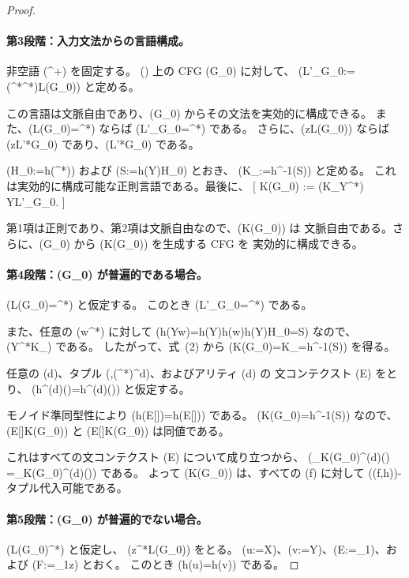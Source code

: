 \documentclass[11pt,a4paper]{ltjsarticle}
\theoremstyle{remark}
\newcommand{\D}{\mathcal{D}}
\newcommand{\tuple}[1]{\vec{#1}}
\newcommand{\blank}{\square}
\newcommand{\eps}{\varepsilon}
\begin{document}
\begin{proof}
\paragraph{第3段階：入力文法からの言語構成。}
非空語 (\beta\in\Sigma^+) を固定する。
(\Sigma) 上の CFG (G_0) に対して、
(L'_{G_0}:=(\Sigma^*\setminus\beta\Sigma^*)\cup\beta L(G_0))
と定める。

この言語は文脈自由であり、(G_0) からその文法を実効的に構成できる。
また、(L(G_0)=\Sigma^*) ならば (L'_{G_0}=\Sigma^*) である。
さらに、(z\notin L(G_0)) ならば
(\beta z\notin L'*{G_0}) であり、(\eps\in L'*{G_0}) である。

(H_0:=h(\Sigma^*)) および (S:=h(Y)H_0) とおき、
(K_{}:=h^{-1}(S)) と定める。
これは実効的に構成可能な正則言語である。最後に、
[
K(G_0)
:=
\bigl(K_{}\setminus Y\Sigma^*\bigr)
\cup YL'_{G_0}.
]

第1項は正則であり、第2項は文脈自由なので、(K(G_0)) は
文脈自由である。さらに、(G_0) から (K(G_0)) を生成する CFG を
実効的に構成できる。

\paragraph{第4段階：(G_0) が普遍的である場合。}
(L(G_0)=\Sigma^*) と仮定する。
このとき (L'_{G_0}=\Sigma^*) である。

また、任意の (w\in\Sigma^*) に対して
(h(Yw)=h(Y)h(w)\in h(Y)H_0=S) なので、
(Y\Sigma^*\subseteq K_{}) である。
したがって、式~\textup{(2)} から
(K(G_0)=K_{}=h^{-1}(S)) を得る。

任意の (d)、タプル
(\tuple{x},\tuple{y}\in(\Sigma^*)^d)、およびアリティ (d) の
文コンテクスト (E) をとり、
(h^{(d)}(\tuple{x})=h^{(d)}(\tuple{y})) と仮定する。

モノイド準同型性により
(h(E[\tuple{x}])=h(E[\tuple{y}])) である。
(K(G_0)=h^{-1}(S)) なので、
(E[\tuple{x}]\in K(G_0)) と
(E[\tuple{y}]\in K(G_0)) は同値である。

これはすべての文コンテクスト (E) について成り立つから、
(\D_{K(G_0)}^{(d)}(\tuple{x})
=\D_{K(G_0)}^{(d)}(\tuple{y})) である。
よって (K(G_0)) は、すべての (f) に対して
((f,h))-タプル代入可能である。

\paragraph{第5段階：(G_0) が普遍的でない場合。}
(L(G_0)\ne\Sigma^*) と仮定し、
(z\in\Sigma^*\setminus L(G_0)) をとる。
(u:=X)、(v:=Y)、(E:=\blank_1)、および
(F:=\blank_1\beta z) とおく。
このとき (h(u)=h(v)) である。


\end{proof}
\end{document}
